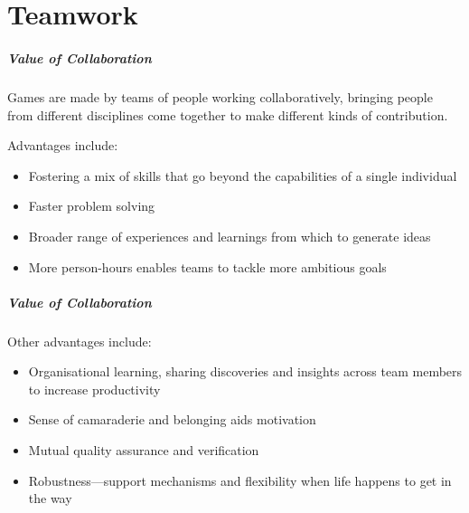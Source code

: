 \part{Teamwork}
\frame{\partpage}

\begin{frame}
	\frametitle{Value of Collaboration}
	
	Games are made by teams of people working collaboratively, bringing people from different disciplines come together to make different kinds of contribution. 
	
	\vspace{1em}
	
	Advantages include:
	
	\begin{itemize}
		\item Fostering a mix of skills that go beyond the capabilities of a single individual
		\item Faster problem solving
		\item Broader range of experiences and learnings from which to generate ideas
		\item More person-hours enables teams to tackle more ambitious goals
	\end{itemize}
\end{frame}

\begin{frame}
	\frametitle{Value of Collaboration}
	
	Other advantages include:
	
	\begin{itemize}
		\item Organisational learning, sharing discoveries and insights across team members to increase productivity
		\item Sense of camaraderie and belonging aids motivation
		\item Mutual quality assurance and verification
		\item Robustness---support mechanisms and flexibility when life happens to get in the way
	\end{itemize}
\end{frame}

